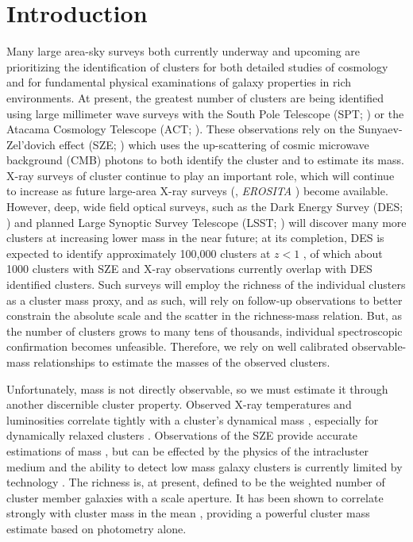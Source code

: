 \section{Introduction} 
Many large area-sky surveys both currently underway and upcoming are prioritizing the identification of clusters for both detailed studies of cosmology and for fundamental physical examinations of galaxy properties in rich environments. At present, the greatest number of clusters are being identified using large millimeter wave surveys with the South Pole Telescope (SPT; \citealt{Carlstrom2011}) or the Atacama Cosmology Telescope (ACT; \citealt{Swetz2011}). These observations rely on the Sunyaev-Zel'dovich effect (SZE; \citealt{Sunyaev1972}) which uses the up-scattering of cosmic microwave background (CMB) photons to both identify the cluster and to estimate its mass. X-ray surveys of cluster  continue to play an important role, which will continue to increase as future large-area X-ray surveys (\eg, \emph{EROSITA} \citealt{Merloni2012}) become available. However, deep, wide field optical surveys, such as the Dark Energy Survey (DES; \citealt{DES2005}) and planned Large Synoptic Survey Telescope (LSST; \citealt{LSST2012}) will discover many more clusters at increasing lower mass in the near future; at its completion, DES is expected to identify approximately 100,000 clusters at $z<1$ \citep{DarkEnergySurveyCollaboration2016}, of which about 1000 clusters with SZE and X-ray observations currently overlap with DES identified clusters. Such surveys will employ the richness of the individual clusters as a cluster mass proxy, and as such, will rely on follow-up observations to better constrain the absolute scale and the scatter in the richness-mass relation. But, as the number of clusters grows to many tens of thousands, individual spectroscopic confirmation becomes unfeasible. Therefore, we rely on well calibrated observable-mass relationships to estimate the masses of the observed clusters.

Unfortunately, mass is not directly observable, so we must estimate it through another discernible cluster property. Observed X-ray temperatures and luminosities correlate tightly with a cluster's dynamical mass , especially for dynamically relaxed clusters . Observations of the SZE provide accurate estimations of mass , but can be effected by the physics of the intracluster medium  and the ability to detect low mass galaxy clusters is currently limited by technology . The richness  is, at present, defined to be the weighted number of cluster member galaxies with a scale aperture. It has been shown to correlate strongly with cluster mass in the mean , providing a powerful cluster mass estimate based on photometry alone.

